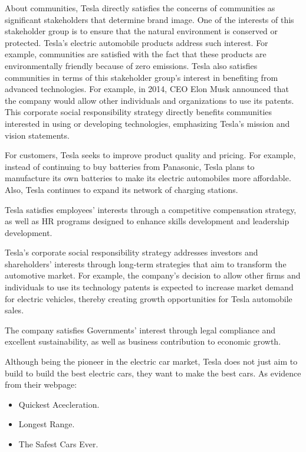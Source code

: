 \documentclass[12pt]{article}
\begin{document}
About communities, Tesla directly satisfies the concerns of communities as significant stakeholders that determine brand image. One of the interests of this stakeholder group is to ensure that the natural environment is conserved or protected. Tesla’s electric automobile products address such interest. For example, communities are satisfied with the fact that these products are environmentally friendly because of zero emissions. Tesla also satisfies communities in terms of this stakeholder group’s interest in benefiting from advanced technologies. For example, in 2014, CEO Elon Musk announced that the company would allow other individuals and organizations to use its patents. This corporate social responsibility strategy directly benefits communities interested in using or developing technologies, emphasizing Tesla’s mission and vision statements.

For customers, Tesla seeks to improve product quality and pricing. For example, instead of continuing to buy batteries from Panasonic, Tesla plans to manufacture its own batteries to make its electric automobiles more affordable. Also, Tesla continues to expand its network of charging stations.

Tesla satisfies employees' interests through a competitive compensation strategy, as well as HR programs designed to enhance skills development and leadership development.

Tesla’s corporate social responsibility strategy addresses investors and shareholders' interests through long-term strategies that aim to transform the automotive market. For example, the company’s decision to allow other firms and individuals to use its technology patents is expected to increase market demand for electric vehicles, thereby creating growth opportunities for Tesla automobile sales.

The company satisfies Governments' interest through legal compliance and excellent sustainability, as well as business contribution to economic growth.

Although being the pioneer in the electric car market, Tesla does not just aim to build to build the best electric cars, they want to make the best cars. As evidence from their webpage:

\begin{itemize}
	\item{Quickest Acecleration.}
	\item{Longest Range.}
	\item{The Safest Cars Ever.}
\end{itemize}
\end{document}
